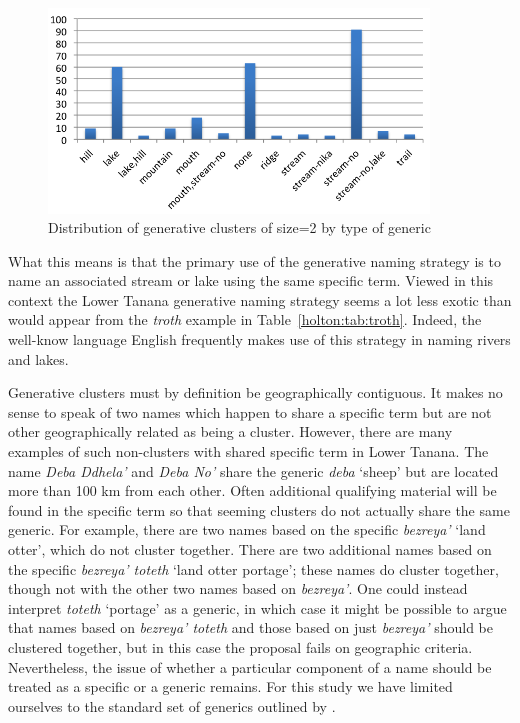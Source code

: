\begin{figure}[h]
  \centering
  \includegraphics[width=0.9\textwidth]{figures/holton-fig3}
  \caption{Distribution of generative clusters of size=2 by type of generic}
  \label{holton:fig:3}
\end{figure}

What this means is that the primary use of the generative naming strategy is to name an associated stream or lake using the same specific term. Viewed in this context the Lower Tanana generative naming strategy seems a lot less exotic than would appear from the \textit{troth} example in Table~\ref{holton:tab:troth}. Indeed, the well-know language English frequently makes use of this strategy in naming rivers and lakes.

Generative clusters must by definition be geographically contiguous. It makes no sense to speak of two names which happen to share a specific term but are not other geographically related as being a cluster. However, there are many examples  of such non-clusters with shared specific term in Lower Tanana. The name \textit{Deba Ddhela’} and \textit{Deba No’}  share the generic \textit{deba} ‘sheep’ but are located more than 100 km from each other. Often additional qualifying material will be found in the specific term so that seeming clusters do not actually share the same generic. For example, there are two names based on the specific \textit{bezreya’} ‘land otter’, which do not cluster together. There are two additional names based on the specific \textit{bezreya’ toteth}  ‘land otter portage’; these names do cluster together, though not with the other two names based on \textit{bezreya’}. One could instead interpret \textit{toteth} ‘portage’ as a generic, in which case it might be possible to argue that names based on \textit{bezreya’ toteth}  and those based on just \textit{bezreya’} should be clustered together, but in this case the proposal fails on geographic criteria. Nevertheless, the issue of whether a particular component of a name should be treated as a specific or a generic remains. For this study we have limited ourselves to the standard set of generics outlined by \citet{kari2008}.

